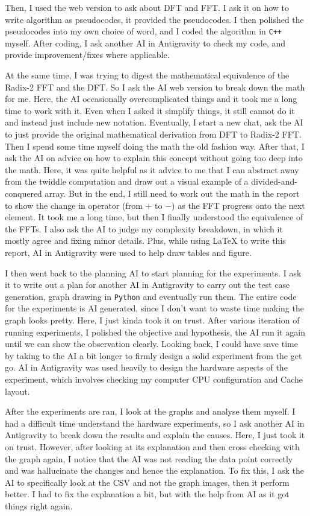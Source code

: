 \documentclass{article}
\begin{document}
Then, I used the web version to ask about DFT and FFT. I ask it on how to write algorithm as pseudocodes, it provided the pseudocodes. I then polished the pseudocodes into my own choice of word, and I coded the algorithm in \texttt{C++} myself. After coding, I ask another AI in Antigravity to check my code, and provide improvement/fixes where applicable. 

At the same time, I was trying to digest the mathematical equivalence of the Radix-2 FFT and the DFT. So I ask the AI web version to break down the math for me. Here, the AI occasionally overcomplicated things and it took me a long time to work with it. Even when I asked it simplify things, it still cannot do it and instead just include new notation. Eventually, I start a new chat, ask the AI to just provide the original mathematical derivation from DFT to Radix-2 FFT. Then I spend some time myself doing the math the old fashion way. After that, I ask the AI on advice on how to explain this concept without going too deep into the math. Here, it was quite helpful as it advice to me that I can abstract away from the twiddle computation and draw out a visual example of a divided-and-conquered array. But in the end, I still need to work out the math in the report to show the change in operator (from + to $-$) as the FFT progress onto the next element. It took me a long time, but then I finally understood the equivalence of the FFTs. I also ask the AI to judge my complexity breakdown, in which it mostly agree and fixing minor details. Plus, while using \LaTeX{}  to write this report, AI in Antigravity were used to help draw tables and figure.

I then went back to the planning AI to start planning for the experiments. I ask it to write out a plan for another AI in Antigravity to carry out the test case generation, graph drawing in \texttt{Python} and eventually run them. The entire code for the experiments is AI generated, since I don't want to waste time making the graph looks pretty. Here, I just kinda took it on trust. After various iteration of running experiments, I polished the objective and hypothesis, the AI run it again until we can show the observation clearly. Looking back, I could have save time by taking to the AI a bit longer to firmly design a solid experiment from the get go. AI in Antigravity was used heavily to design the hardware aspects of the experiment, which involves checking my computer CPU configuration and Cache layout.

After the experiments are ran, I look at the graphs and analyse them myself. I had a difficult time understand the hardware experiments, so I ask another AI in Antigravity to break down the results and explain the causes. Here, I just took it on trust. However, after looking at its explanation and then cross checking with the graph again, I notice that the AI was not reading the data point correctly and was hallucinate the changes and hence the explanation. To fix this, I ask the AI to specifically look at the CSV and not the graph images, then it perform better. I had to fix the explanation a bit, but with the help from AI as it got things right again.
\end{document}
